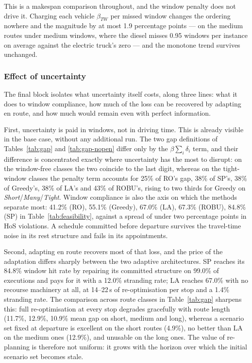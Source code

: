 This is a makespan comparison throughout, and the window penalty does not drive
it.  Charging each vehicle $\beta_{TW}$ per missed window changes the ordering
nowhere and the magnitude by at most 1.9 percentage points --- on the medium
routes under medium windows, where the diesel misses 0.95 windows per instance
on average against the electric truck's zero --- and the monotone trend
survives unchanged.


\subsubsection{Effect of uncertainty}
\label{sec:uncertainty}

The final block isolates what uncertainty itself costs, along three lines: what
it does to window compliance, how much of the loss can be recovered by adapting
en route, and how much would remain even with perfect information.

First, uncertainty is paid in windows, not in driving time.  This is already
visible in the base case, without any additional run.  The two gap definitions
of Tables~\ref{tab:gap} and \ref{tab:gap-nopen} differ only by the
$\beta\sum_i\delta_i$ term, and their difference is concentrated exactly where
uncertainty has the most to disrupt: on the window-free classes the two coincide
to the last digit, whereas on the tight-window classes the penalty term accounts
for 25\% of RO's gap, 38\% of SP's, 38\% of Greedy's, 38\% of LA's and 43\% of
ROBU's, rising to two thirds for Greedy on
\emph{Short}/\emph{Many}/\emph{Tight}.  Window compliance is also the axis on
which the methods separate most: 41.2\% (RO), 55.1\% (Greedy), 67.0\% (LA),
67.3\% (ROBU), 84.8\% (SP) in Table~\ref{tab:feasibility}, against a spread of
under two percentage points in HoS violations.  A schedule committed before
departure survives the travel-time noise in its rest structure and fails in its
appointments.

Second, adapting en route recovers most of that loss, and the price of the
adaptation differs sharply between the two adaptive architectures.  SP reaches
its 84.8\% window hit rate by repairing its committed structure on 99.0\% of
executions and pays for it with a 12.0\% stranding rate; LA reaches 67.0\% with
no recourse machinery at all, at 14--22\,s of re-optimisation per stop and a
1.4\% stranding rate.  The comparison across route classes in
Table~\ref{tab:gap} sharpens this: full re-optimisation at every stop degrades
gracefully with route length (11.7\%, 12.9\%, 10.9\% mean gap on short, medium
and long), whereas a scenario set fixed at departure is excellent on the short
routes (4.9\%), no better than LA on the medium ones (12.9\%), and unusable on
the long ones.  The value of re-planning is therefore not uniform: it grows with
the horizon over which the initial scenario set becomes stale.

